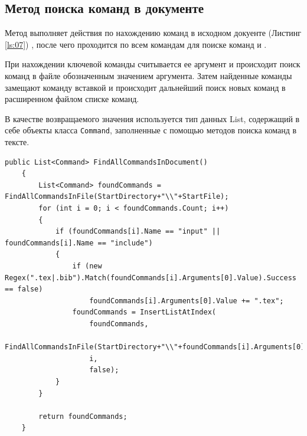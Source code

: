\subsection{Метод поиска команд в документе}

     Метод выполняет действия по нахождению команд в исходном докуенте (Листинг \ref{ls:07}) , после чего проходится по всем командам для поиске команд \verb|| и \verb||.
 
     При нахождении ключевой команды считывается ее аргумент и происходит поиск команд в файле обозначенным значением аргумента.
     Затем найденные команды замещают команду вставкой и 
      происходит дальнейший поиск новых команд в расширенном файлом списке команд.

      В качестве возвращаемого значения используется тип данных List, содержащий в себе объекты класса \verb|Command|, заполненные с помощью методов поиска команд в тексте.

    \begin{lstlisting}[caption={Метод поиска команд в документе}, label={ls:07}]
    public List<Command> FindAllCommandsInDocument()
    {
        List<Command> foundCommands = FindAllCommandsInFile(StartDirectory+"\\"+StartFile);
        for (int i = 0; i < foundCommands.Count; i++)
        {
            if (foundCommands[i].Name == "input" || foundCommands[i].Name == "include")
            {
                if (new Regex(".tex|.bib").Match(foundCommands[i].Arguments[0].Value).Success == false)
                    foundCommands[i].Arguments[0].Value += ".tex";
                foundCommands = InsertListAtIndex(
                    foundCommands,
                    FindAllCommandsInFile(StartDirectory+"\\"+foundCommands[i].Arguments[0].Value),
                    i,
                    false);
            }
        }

        return foundCommands;
    }
    \end{lstlisting}



